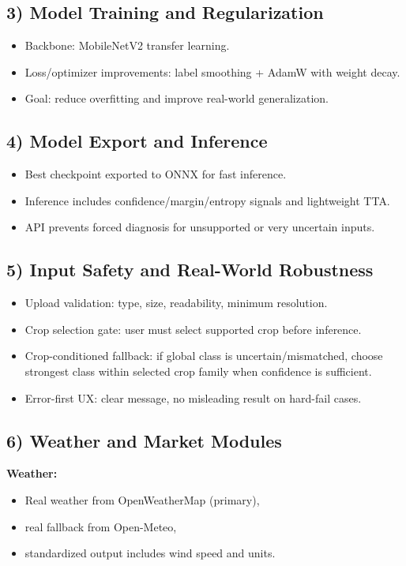 \documentclass[11pt,a4paper]{article}
\begin{document}
\subsection{3) Model Training and Regularization}
\begin{itemize}[noitemsep]
  \item Backbone: MobileNetV2 transfer learning.
  \item Loss/optimizer improvements: label smoothing + AdamW with weight decay.
  \item Goal: reduce overfitting and improve real-world generalization.
\end{itemize}

\subsection{4) Model Export and Inference}
\begin{itemize}[noitemsep]
  \item Best checkpoint exported to ONNX for fast inference.
  \item Inference includes confidence/margin/entropy signals and lightweight TTA.
  \item API prevents forced diagnosis for unsupported or very uncertain inputs.
\end{itemize}

\subsection{5) Input Safety and Real-World Robustness}
\begin{itemize}[noitemsep]
  \item Upload validation: type, size, readability, minimum resolution.
  \item Crop selection gate: user must select supported crop before inference.
  \item Crop-conditioned fallback: if global class is uncertain/mismatched, choose strongest class within selected crop family when confidence is sufficient.
  \item Error-first UX: clear message, no misleading result on hard-fail cases.
\end{itemize}

\subsection{6) Weather and Market Modules}
\textbf{Weather:}
\begin{itemize}[noitemsep]
  \item Real weather from OpenWeatherMap (primary),
  \item real fallback from Open-Meteo,
  \item standardized output includes wind speed and units.
\end{itemize}
\end{document}
